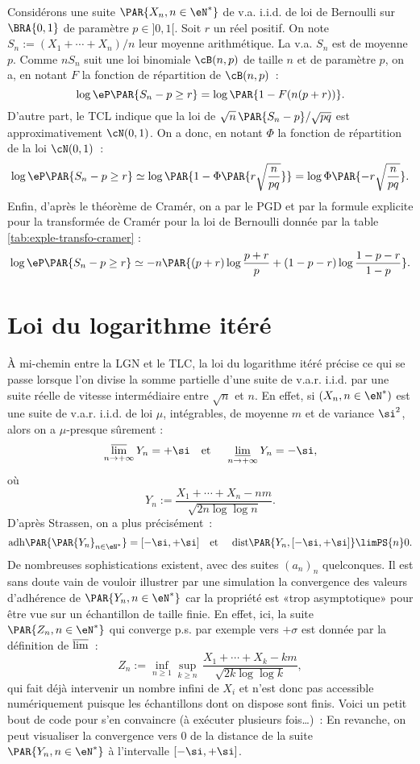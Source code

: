 \begin{example}
  Considérons une suite $\PAR{X_n,n\in\eN^*}$ de v.a. i.i.d. de loi de
  Bernoulli sur $\BRA{0,1}$ de paramètre $p\in]0,1[$. Soit $r$ un réel
  positif. On note $S_n:=(X_1+\cdots+X_n)/n$ leur moyenne arithmétique. La
  v.a. $S_n$ est de moyenne $p$. Comme $nS_n$ suit une loi binomiale
  $\cB(n,p)$ de taille $n$ et de paramètre $p$, on a, en notant $F$ la
  fonction de répartition de $\cB(n,p)$~:
  $$
  \log \eP\PAR{S_n-p \geq r}= \log \PAR{1-F(n(p+r))}.
  $$
  D'autre part, le TCL indique que la loi de
  $\sqrt{n}\,\PAR{S_n-p}/\sqrt{pq}$ est approximativement $\cN(0,1)$. On a
  donc, en notant $\Phi$ la fonction de répartition de la loi $\cN(0,1)$~:
  $$
  \log \eP\PAR{S_n-p \geq r} \simeq \log \PAR{1-\Phi\PAR{r\sqrt{\frac{n}{pq}}}}
  = \log \Phi\PAR{-r\sqrt{\frac{n}{pq}}}.
  $$
  Enfin, d'après le théorème de Cramér, on a par le PGD et par la formule
  explicite pour la transformée de Cramér pour la loi de Bernoulli donnée par
  la table \ref{tab:exple-transfo-cramer} :
  $$
  \log \eP\PAR{S_n-p \geq r}
  \simeq -n\PAR{(p+r)\log\frac{p+r}{p} + (1-p-r)\log\frac{1-p-r}{1-p}}.
  $$  
\end{example}


%
\section{Loi du logarithme itéré}
%

À mi-chemin entre la LGN et le TLC, la loi du logarithme itéré précise ce qui
se passe lorsque l'on divise la somme partielle d'une suite de v.a.r. i.i.d.
par une suite réelle de vitesse intermédiaire entre $\sqrt{n}$ et $n$. En
effet, si $(X_n,n\in\eN^*)$ est une suite de v.a.r. i.i.d. de loi $\mu$,
intégrables, de moyenne $m$ et de variance $\si^2$, alors on a $\mu$-presque
sûrement :
$$
\varlimsup_{n\to+\infty} Y_n=+\si 
\text{\quad et \quad} 
\varliminf_{n\to+\infty} Y_n=-\si,
$$
où
$$
Y_n:=\frac{X_1+\cdots+X_n-nm}{\sqrt{2n\log\log n}}.
$$
D'après Strassen, on a plus précisément~:
$$
\mathrm{adh}\PAR{\PAR{Y_n}_{n\in\eN^*}}=[-\si,+\si]
\text{\quad et \quad}
\mathrm{dist}\PAR{Y_n,[-\si,+\si]}\limPS{n} 0.
$$
De nombreuses sophistications existent, avec des suites $(a_n)_n$
quelconques. Il est sans doute vain de vouloir illustrer par une simulation la
convergence des valeurs d'adhérence de $\PAR{Y_n,n\in\eN^*}$ car la propriété
est «trop asymptotique» pour être vue sur un échantillon de taille finie. En
effet, ici, la suite $\PAR{Z_n,n\in\eN^*}$ qui converge p.s. par exemple vers
$+\sigma$ est donnée par la définition de $\varlimsup$~:
$$
Z_n:=\inf_{n\geq 1}\sup_{k\geq n}\,\frac{X_1+\cdots+X_k-km}{\sqrt{2k\log\log k}},
$$
qui fait déjà intervenir un nombre infini de $X_i$ et n'est donc pas
accessible numériquement puisque les échantillons dont on dispose sont finis.
Voici un petit bout de code pour s'en convaincre (à exécuter plusieurs
fois\ldots)~:
%
%
En revanche, on peut visualiser la convergence vers $0$ de la distance de la
suite $\PAR{Y_n,n\in\eN^*}$ à l'intervalle $[-\si,+\si]$. 

